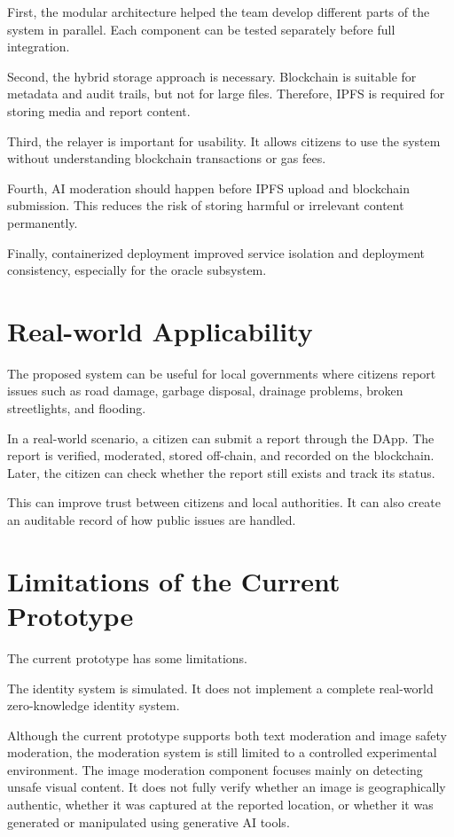 First, the modular architecture helped the team develop different parts of the system in parallel. Each component can be tested separately before full integration.

Second, the hybrid storage approach is necessary. Blockchain is suitable for metadata and audit trails, but not for large files. Therefore, IPFS is required for storing media and report content.

Third, the relayer is important for usability. It allows citizens to use the system without understanding blockchain transactions or gas fees.

Fourth, AI moderation should happen before IPFS upload and blockchain submission. This reduces the risk of storing harmful or irrelevant content permanently.

Finally, containerized deployment improved service isolation and deployment consistency, especially for the oracle subsystem.

\section{Real-world Applicability}

The proposed system can be useful for local governments where citizens report issues such as road damage, garbage disposal, drainage problems, broken streetlights, and flooding.

In a real-world scenario, a citizen can submit a report through the DApp. The report is verified, moderated, stored off-chain, and recorded on the blockchain. Later, the citizen can check whether the report still exists and track its status.

This can improve trust between citizens and local authorities. It can also create an auditable record of how public issues are handled.

\section{Limitations of the Current Prototype}

The current prototype has some limitations.

The identity system is simulated. It does not implement a complete real-world zero-knowledge identity system.

Although the current prototype supports both text moderation and image safety
moderation, the moderation system is still limited to a controlled experimental
environment. The image moderation component focuses mainly on detecting unsafe
visual content. It does not fully verify whether an image is geographically
authentic, whether it was captured at the reported location, or whether it was
generated or manipulated using generative AI tools.

